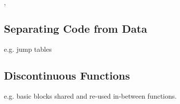 
\cite{singled_graph_disassembly}, \cite{superset_disassembly}


\subsection{Separating Code from Data}
\label{sec:separating-code-from-data}

e.g. jump tables




\subsection{Discontinuous Functions}

e.g. basic blocks shared and re-used in-between functions.

%
%
